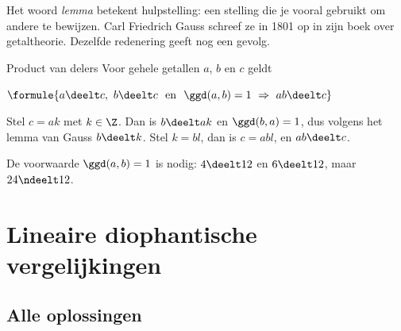 Het woord \textit{lemma} betekent hulpstelling: een stelling die je vooral gebruikt om andere te bewijzen. Carl Friedrich Gauss schreef ze in 1801 op in zijn boek over getaltheorie. Dezelfde redenering geeft nog een gevolg.

\begin{theorie}
\begin{stelling}{Product van delers}
Voor gehele getallen $a$, $b$ en $c$ geldt

\vspace{1mm}
\qquad $\formule{a \deelt c, \ b \deelt c \ \text{ en } \ \ggd(a, b) = 1 \ \Rightarrow \ ab \deelt c}$
\end{stelling}

\begin{bewijs}
Stel $c = ak$ met $k \in \Z$. Dan is $b \deelt ak$ en $\ggd(b, a) = 1$, dus volgens het lemma van Gauss $b \deelt k$. Stel $k = bl$, dan is $c = abl$, en $ab \deelt c$.
\end{bewijs}
\end{theorie}

De voorwaarde $\ggd(a, b) = 1$ is nodig: $4 \deelt 12$ en $6 \deelt 12$, maar $24 \ndeelt 12$.


\begin{oefeningen}
\end{oefeningen}

\section{Lineaire diophantische vergelijkingen}

\subsection{Alle oplossingen}

